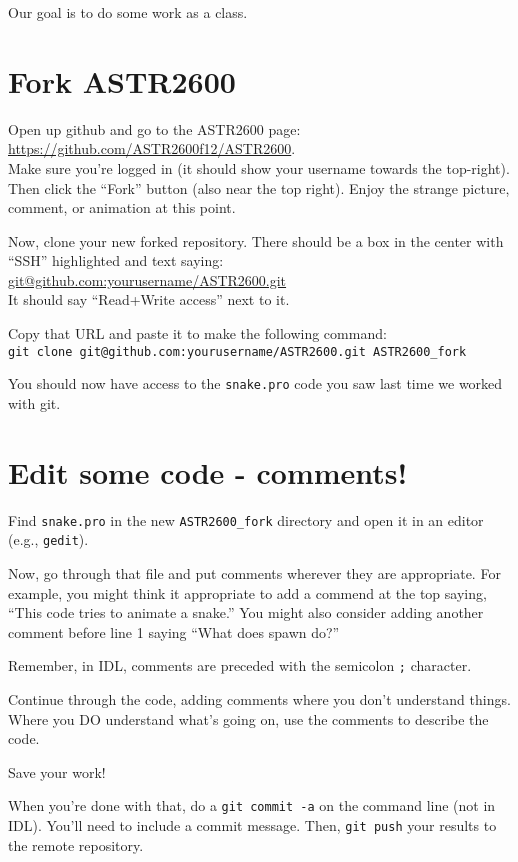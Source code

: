 \documentclass{article}
\begin{document}
\begin{spacing}{1.0}
Our goal is to do some work as a class.

\section{Fork ASTR2600}
Open up github and go to the ASTR2600 page: \url{https://github.com/ASTR2600f12/ASTR2600}.\\
Make sure you're logged in (it should show your username towards the top-right).\\
Then click the ``Fork'' button (also near the top right).  Enjoy the strange picture,
comment, or animation at this point.

Now, clone your new forked repository.  There should be a box in the center with 
``SSH'' highlighted and text saying:\\ 
\url{git@github.com:yourusername/ASTR2600.git}\\
It should say ``Read+Write access'' next to it.

Copy that URL and paste it to make the following command:\\
\verb|git clone git@github.com:yourusername/ASTR2600.git ASTR2600_fork|

You should now have access to the \texttt{snake.pro} code you saw last time we 
worked with git.

\section{Edit some code - comments!}

Find \texttt{snake.pro} in the new \verb|ASTR2600_fork| directory and open it
in an editor (e.g., \verb|gedit|).

Now, go through that file and put comments wherever they are appropriate.
For example, you might think it appropriate to add a commend at the top saying,
``This code tries to animate a snake.''  You might also consider adding another
comment before line 1 saying ``What does spawn do?''

Remember, in IDL, comments are preceded with the semicolon \verb|;| character.

Continue through the code, adding comments where you don't understand things.
Where you DO understand what's going on, use the comments to describe the code.

Save your work!  

When you're done with that, do a \verb|git commit -a| on the command line (not 
in IDL).  You'll need to include a commit message.  Then, \verb|git push| your
results to the remote repository.


\end{spacing}
\end{document}
